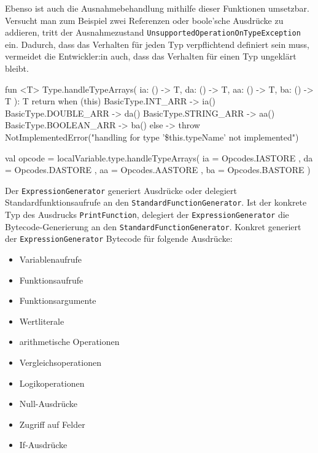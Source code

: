 Ebenso ist auch die Ausnahmebehandlung mithilfe dieser Funktionen umsetzbar. Versucht man zum Beispiel zwei Referenzen oder boole'sche Ausdrücke zu addieren, tritt der Ausnahmezustand \texttt{UnsupportedOperationOnTypeException} ein. Dadurch, dass das Verhalten für jeden Typ verpflichtend definiert sein muss, vermeidet die Entwickler:in auch, dass das Verhalten für einen Typ ungeklärt bleibt.

\begin{KotlinCode}[numbers=none, caption={Die Erweiterungsfunktion \texttt{Type.handleTypeArrays()}, um den richtigen Opcode zum Speichern einer Variable zu ermitteln.}, label=lst:impl_handletypearrays]
fun <T> Type.handleTypeArrays(
    ia: () -> T,
    da: () -> T,
    aa: () -> T,
    ba: () -> T
): T {
    return when (this) {
        BasicType.INT_ARR -> ia()
        BasicType.DOUBLE_ARR -> da()
        BasicType.STRING_ARR -> aa()
        BasicType.BOOLEAN_ARR -> ba()
        else -> throw NotImplementedError("handling for type '\${this.typeName}' not implemented")
    }
}

val opcode = localVariable.type.handleTypeArrays(
    ia = { Opcodes.IASTORE },
    da = { Opcodes.DASTORE },
    aa = { Opcodes.AASTORE },
    ba = { Opcodes.BASTORE }
)
\end{KotlinCode}

Der \texttt{ExpressionGenerator} generiert Ausdrücke oder delegiert Standardfunktionsaufrufe an den \texttt{StandardFunctionGenerator}. Ist der konkrete Typ des Ausdrucks \texttt{PrintFunction}, delegiert der \texttt{ExpressionGenerator} die Bytecode-Generierung an den \texttt{StandardFunctionGenerator}. Konkret generiert der \texttt{ExpressionGenerator} Bytecode für folgende Ausdrücke:

\begin{itemize}
    \item Variablenaufrufe
    \item Funktionsaufrufe
    \item Funktionsargumente
    \item Wertliterale
    \item arithmetische Operationen
    \item Vergleichsoperationen
    \item Logikoperationen
    \item Null-Ausdrücke
    \item Zugriff auf Felder
    \item If-Ausdrücke
\end{itemize}

